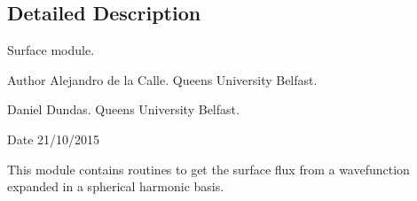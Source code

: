 \subsection{Detailed Description}
Surface module. 

\begin{DoxyAuthor}{Author}
Alejandro de la Calle. Queen\textquotesingle{}s University Belfast. 

Daniel Dundas. Queen\textquotesingle{}s University Belfast. 
\end{DoxyAuthor}
\begin{DoxyDate}{Date}
21/10/2015
\end{DoxyDate}
This module contains routines to get the surface flux from a wavefunction expanded in a spherical harmonic basis. 